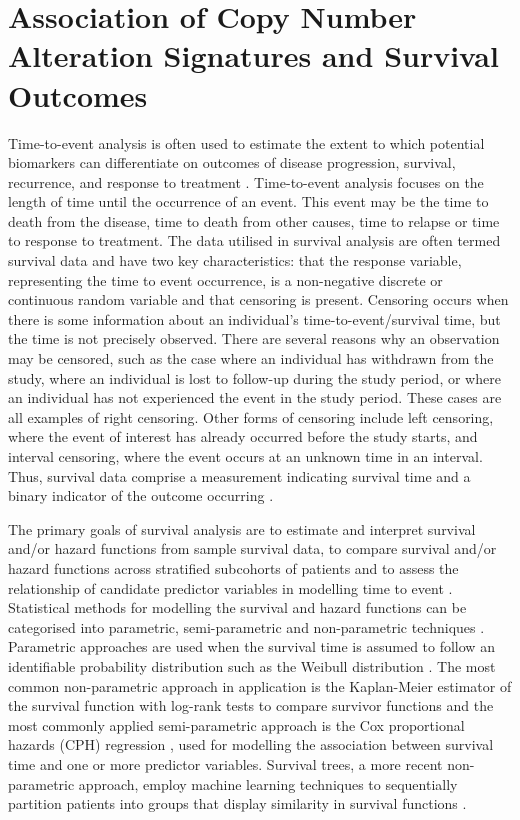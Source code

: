 \section{Association of Copy Number Alteration Signatures and Survival Outcomes}
Time-to-event analysis is often used to estimate the extent to which potential biomarkers can differentiate on outcomes of disease progression, survival, recurrence, and response to treatment \citep{kleinbaum_klein_2012}. Time-to-event analysis focuses on the length of time until the occurrence of an event. This event may be the time to death from the disease, time to death from other causes, time to relapse or time to response to treatment. The data utilised in survival analysis are often termed survival data and have two key characteristics: that the response variable, representing the time to event occurrence, is a non-negative discrete or continuous random variable and that censoring is present. Censoring occurs when there is some information about an individual's time-to-event/survival time, but the time is not precisely observed. There are several reasons why an observation may be censored, such as the case where an individual has withdrawn from the study, where an individual is lost to follow-up during the study period, or where an individual has not experienced the event in the study period. These cases are all examples of right censoring. Other forms of censoring include left censoring, where the event of interest has already occurred before the study starts, and interval censoring, where the event occurs at an unknown time in an interval. Thus, survival data comprise a measurement indicating survival time and a binary indicator of the outcome occurring \citep{kleinbaum_klein_2012, moore_2016}. 

The primary goals of survival analysis are to estimate and interpret survival and/or hazard functions from sample survival data, to compare survival and/or hazard functions across stratified subcohorts of patients and to assess the relationship of candidate predictor variables in modelling time to event \citep{kleinbaum_klein_2012}. Statistical methods for modelling the survival and hazard functions can be categorised into parametric, semi-parametric and non-parametric techniques \citep{kleinbaum_klein_2012}. Parametric approaches are used when the survival time is assumed to follow an identifiable probability distribution such as the Weibull distribution \citep{pmid25220693}. The most common non-parametric approach in application is the Kaplan-Meier estimator \citep{kaplan58} of the survival function with log-rank tests \citep{pmid15117797} to compare survivor functions and the most commonly applied semi-parametric approach is the Cox proportional hazards (CPH) regression \citep{Cox}, used for modelling the association between survival time and one or more predictor variables. Survival trees, a more recent non-parametric approach, employ machine learning techniques to sequentially partition patients into groups that display similarity in survival functions \citep{pmid31896241}.  

